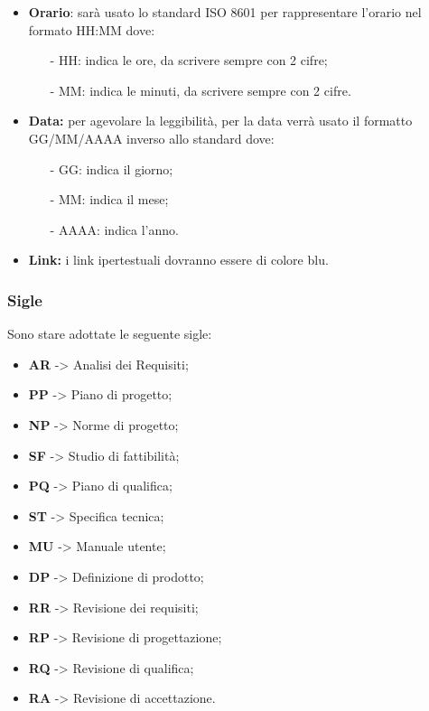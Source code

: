 \documentclass[a4paper,11pt]{article}
\begin{document}
			\begin{itemize}
				\item \textbf{Orario}: sarà usato lo standard ISO 8601 per rappresentare l'orario nel formato HH:MM dove:
					\begin{itemize}
					\item[-]HH: indica le ore, da scrivere sempre con 2 cifre;
					\item[-]MM: indica le minuti, da scrivere sempre con 2 cifre.
					\end{itemize}
				\item \textbf{Data:}  per agevolare la leggibilità, per la data verrà usato il formatto GG/MM/AAAA inverso allo standard dove:
				\begin{itemize}
				\item[-]GG: indica il giorno;
				\item[-]MM: indica il mese;
				\item[-]AAAA: indica l'anno.
				\end{itemize}
				\item \textbf{Link:} i link ipertestuali dovranno essere di colore blu.
			\end{itemize}
			\subsubsection{Sigle}
			Sono stare adottate le seguente sigle:
			\begin{itemize}
			\item \textbf{AR} -> Analisi dei Requisiti;
			\item \textbf{PP} -> Piano di progetto;
			\item \textbf{NP} -> Norme di progetto;
			\item \textbf{SF} -> Studio di fattibilità;
			\item \textbf{PQ} -> Piano di qualifica;
			\item \textbf{ST} -> Specifica tecnica;
			\item \textbf{MU} -> Manuale utente;
			\item \textbf{DP} -> Definizione di prodotto;
			\item \textbf{RR} -> Revisione dei requisiti;
			\item \textbf{RP} -> Revisione di progettazione;
			\item \textbf{RQ} -> Revisione di qualifica;
			\item \textbf{RA} -> Revisione di accettazione.
			\end{itemize}
\end{document}
